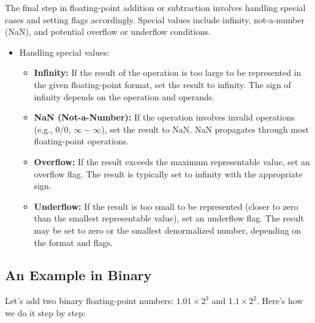 \documentclass[12pt,openany]{book}
\begin{document}
			      	The final step in floating-point addition or subtraction involves handling special cases and setting flags accordingly. Special values include infinity, not-a-number (NaN), and potential overflow or underflow conditions.
			      	    
			      	\begin{itemize}
			      		\item[] Handling special values:
			      		      \begin{itemize}
			      		      	\item \textbf{Infinity:} If the result of the operation is too large to be represented in the given floating-point format, set the result to infinity. The sign of infinity depends on the operation and operands.
			      		      	\item \textbf{NaN (Not-a-Number):} If the operation involves invalid operations (e.g., \(0/0\), \(\infty - \infty\)), set the result to NaN. NaN propagates through most floating-point operations.
			      		      	\item \textbf{Overflow:} If the result exceeds the maximum representable value, set an overflow flag. The result is typically set to infinity with the appropriate sign.
			      		      	\item \textbf{Underflow:} If the result is too small to be represented (closer to zero than the smallest representable value), set an underflow flag. The result may be set to zero or the smallest denormalized number, depending on the format and flags.
			      		      \end{itemize}
			      	\end{itemize}
			      	
			      	
			      	\subsection{An Example in Binary}
			      	
			      	Let's add two binary floating-point numbers: $1.01 \times 2^3$ and $1.1 \times 2^2$. Here's how we do it step by step:
			      	
\end{document}
